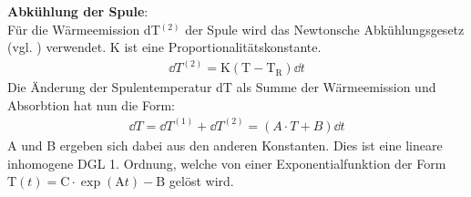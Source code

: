 \documentclass[12pt,a4paper]{article}
\begin{document}
\noindent\textbf{Abkühlung der Spule}:\\
Für die Wärmeemission dT$^{(2)}$ der Spule wird das Newtonsche Abkühlungsgesetz (vgl. \cite{hemmert}) verwendet. K ist eine Proportionalitätskonstante.
\begin{align*}
\dd T^{(2)} = \text{K}(\text{T}-\text{T}_{\text{R}})\dd t
\end{align*}
Die Änderung der Spulentemperatur dT als Summe der Wärmeemission und Absorbtion  hat nun die Form:
\begin{align}
\dd T = \dd T^{(1)}+\dd T^{(2)} = (A\cdot T+B)\dd t
\end{align}
A und B ergeben sich dabei aus den anderen Konstanten.
Dies ist eine lineare inhomogene DGL 1. Ordnung, welche von einer Exponentialfunktion der Form $\text{T}(t)=\text{C}\cdot \exp(\text{A}t)-\text{B}$ gelöst wird.
\end{document}
